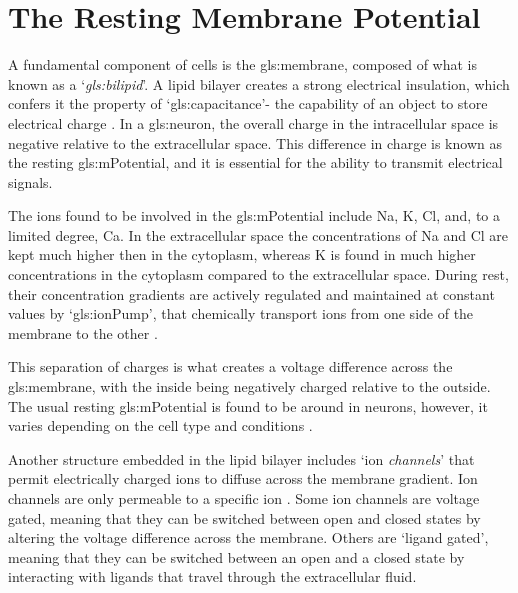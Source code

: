 \documentclass[../../Orator]{subfiles}
\begin{document}
\section{The Resting Membrane Potential} 
A fundamental component of cells is the \gls{gls:membrane}, composed of what is known as a `\textit{\gls{gls:bilipid}}'\footnotemark. A lipid bilayer creates a strong electrical insulation, 
which confers it the property of `\gls{gls:capacitance}'- the capability of an object to store electrical charge \cite{}.  
In a \gls{gls:neuron}, the overall charge in the intracellular space is negative relative to the extracellular space. 
This difference in charge is known as the resting \gls{gls:mPotential}, and it is essential for the  ability to transmit electrical signals. 


The ions found to be involved in the \gls{gls:mPotential} include \gls{Na}, \gls{K}, \gls{Cl}, and, to a limited degree, \gls{Ca}. 
In the extracellular space the concentrations of \gls{Na} and  \gls{Cl} are kept much higher then in the cytoplasm, whereas \gls{K} is found in much higher concentrations  in the cytoplasm compared to the extracellular space. During rest, their concentration gradients are actively regulated and maintained at constant values by `\gls{gls:ionPump}', that chemically transport ions from one side of the membrane to the other \cite{}. 

This separation of charges is what creates a voltage difference across the \gls{gls:membrane}, with the inside being negatively charged relative to the outside. The usual resting \gls{gls:mPotential} is found to be around  in neurons, however, it varies depending on the cell type and conditions \cite{}. 

Another structure embedded in the lipid bilayer includes `ion \textit{channels}' that permit electrically charged ions to diffuse across the membrane gradient. Ion channels are only permeable to a specific ion \cite{}. Some ion channels are voltage gated, meaning that they can be switched between open and closed states by altering the voltage difference across the membrane. 
Others are `ligand gated', meaning that they can be switched between an open and a closed state by interacting with ligands that travel through the extracellular fluid. 

\vspace{1em}
\end{document}

